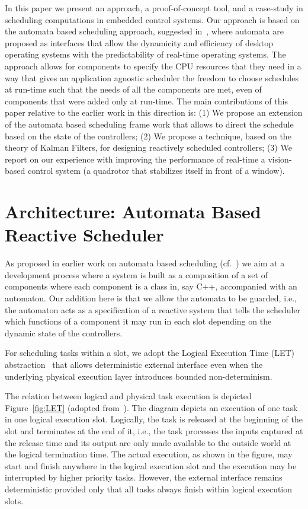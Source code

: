 \documentclass{sig-alternate-ipsn13}
\begin{document}
In this paper we present an approach, a proof-of-concept tool, and a case-study in scheduling computations in embedded control systems. Our approach is based on the automata based scheduling approach, suggested in~\cite{WA07,RTComposer,AW08}, where automata are proposed as interfaces that allow the dynamicity and efficiency of desktop operating systems with the predictability of real-time operating systems. The approach allows for components to specify the CPU resources that they need in a way that gives an application agnostic scheduler the freedom to choose schedules at run-time such that the needs of all the components are met, even of components that were added only at run-time.  The main contributions of this paper relative to the earlier work in this direction is:
(1) We propose an extension of the automata based scheduling frame work that allows to direct the schedule based on the state of the controllers; (2) We propose a technique, based on the theory of Kalman Filters, for designing reactively scheduled controllers; (3) We report on our experience with improving the performance of real-time a vision-based control system (a quadrotor that stabilizes itself in front of a window).

\section{Architecture: Automata Based Reactive Scheduler}
\label{sec:architecture}

As proposed in earlier work on automata based scheduling (cf.~\cite{WA07,RTComposer,AW08}) we aim at a development process where a system is built as a composition of a set of components where each component is a class in, say C++, accompanied with an automaton. Our addition here is that we allow the automata to be guarded, i.e., the automaton acts as a specification of a reactive system that tells the scheduler which functions of a component it may run in each slot depending on the dynamic state of the controllers.

For scheduling tasks within a slot, we adopt the Logical Execution Time (LET)
abstraction~\cite{DBLP:journals/pieee/HenzingerHK03} that allows deterministic
external interface even when the underlying physical execution layer introduces
bounded non-determinism.

The relation between logical and physical task execution is depicted Figure~\ref{fig:LET} (adopted
from~\cite{DBLP:conf/lctrts/FarcasFPT05}). The diagram depicts an execution of one task in one
logical execution slot.  Logically, the task is released at the beginning of the slot and terminates
at the end of it, i.e., the task processes the inputs captured at the release time and its output
are only made available to the outside world at the logical termination time. The actual execution,
as shown in the figure, may start and finish anywhere in the logical execution slot and the
execution may be interrupted by higher priority tasks. However, the external interface remains
deterministic provided only that all tasks always finish within logical execution slots.
\end{document}
